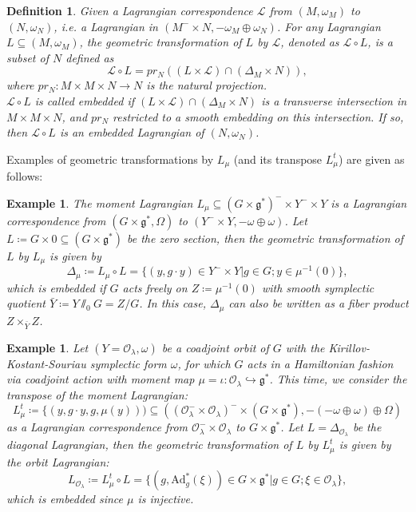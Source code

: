 \documentclass{amsart}
\newtheorem{defn}[theorem]{Definition}
\newtheorem{example}[theorem]{Example}
\numberwithin{equation}{section}
\newcommand{\Ad}{\mathrm{Ad}}
\begin{document}
\begin{defn}
Given a Lagrangian correspondence $\mathcal{L}$ from $(M, \omega_M)$ to $(N, \omega_N)$, i.e. a Lagrangian in $(M^- \times N, -\omega_M\oplus\omega_N)$. For any Lagrangian $L \subseteq (M, \omega_M)$, the geometric transformation of $L$ by $\mathcal{L}$, denoted as $\mathcal{L} \circ L$, is a subset of $N$ defined as
\begin{equation}
\mathcal{L} \circ L = pr_{N}((L \times \mathcal{L})\cap (\Delta_{M} \times N)),
\end{equation}
where $pr_{N} :M \times M \times N \rightarrow N$ is the natural projection.\\

$\mathcal{L} \circ L$ is called embedded if 
   $(L \times \mathcal{L})\cap (\Delta_{M} \times N)$ is a transverse intersection in $M \times M \times N$, and    
$pr_{N}$ restricted to a smooth embedding on this intersection. If so, then $\mathcal{L} \circ L$ is an embedded Lagrangian of $(N, \omega_N)$.
\end{defn}

Examples of geometric transformations by $L_\mu$ (and its transpose $L^t_\mu$) are given as follows:

\begin{example}\label{example:shift-diagonal}
The moment Lagrangian $L_\mu \subseteq (G \times \mathfrak{g}^*)^- \times Y^- \times Y$ is a Lagrangian correspondence from $(G \times \mathfrak{g}^*, \Omega)$ to $(Y^- \times Y, -\omega \oplus \omega)$. Let $L \coloneqq G \times {0} \subseteq (G \times \mathfrak{g}^*)$ be the zero section, then the geometric transformation of $L$ by $L_\mu$ is given by 
$$\Delta_\mu \coloneqq L_\mu \circ L =  \{(y, g\cdot y) \in Y^- \times Y | g\in G; y\in \mu^{-1}(0)\},$$
which is embedded if $G$ acts freely on $Z \coloneqq \mu^{-1}(0)$ with smooth symplectic quotient $\bar{Y} \coloneqq Y\sslash_0 G = Z/G$. In this case, $\Delta_\mu$ can also be written as a fiber product $Z \times_{\bar{Y}} Z$.
\end{example}    

\begin{example}\label{example:orbit-lagrangian}
    Let $(Y = \mathcal{O}_\lambda, \omega)$ be a coadjoint orbit of $G$ with the Kirillov-Kostant-Souriau symplectic form $\omega$, 
    for which $G$ acts in a Hamiltonian fashion via coadjoint action with moment map $\mu = \iota: \mathcal{O}_\lambda \hookrightarrow \mathfrak{g}^*$. 
    This time, we consider the transpose of the moment Lagrangian:
    $$L^t_\mu \coloneqq \{(y, g\cdot y, g, \mu(y))) \subseteq ((\mathcal{O}_\lambda^- \times \mathcal{O}_\lambda)^- \times (G \times \mathfrak{g}^*), -(-\omega\oplus\omega)\oplus\Omega)$$ 
    as a Lagrangian correspondence from $\mathcal{O}_\lambda^- \times \mathcal{O}_\lambda$ to $G \times \mathfrak{g}^*$. Let $L = \Delta_{\mathcal{O}_\lambda}$ be the diagonal Lagrangian, 
    then the geometric transformation of $L$ by $L^t_\mu$ is given by the orbit Lagrangian:
    $$L_{\mathcal{O}_\lambda} \coloneqq L^t_\mu \circ L =  \{(g, \Ad^*_g(\xi)) \in G \times \mathfrak{g}^* | g\in G; \xi\in \mathcal{O}_\lambda\},$$
    which is embedded since $\mu$ is injective.
\end{example}
\end{document}
